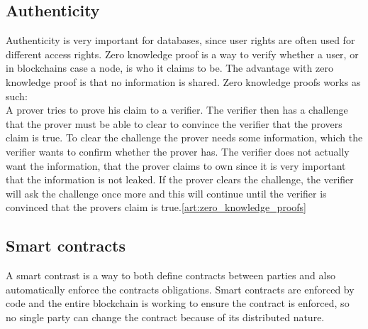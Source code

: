 \subsection{Authenticity}
Authenticity is very important for databases, since user rights are often used for different access rights. Zero knowledge proof is a way to verify whether a user, or in blockchains case a node, is who it claims to be. The advantage with zero knowledge proof is that no information is shared. Zero knowledge proofs works as such:\\
A prover tries to prove his claim to a verifier. The verifier then has a challenge that the prover must be able to clear to convince the verifier that the provers claim is true. To clear the challenge the prover needs some information, which the verifier wants to confirm whether the prover has. The verifier does not actually want the information, that the prover claims to own since it is very important that the information is not leaked. If the prover clears the challenge, the verifier will ask the challenge once more and this will continue until the verifier is convinced that the provers claim is true.\ref{art:zero_knowledge_proofs}




\subsection{Smart contracts}
A smart contrast is a way to both define contracts between parties and also automatically enforce the contracts obligations. Smart contracts are enforced by code and the entire blockchain is working to ensure the contract is enforced, so no single party can change the contract because of its distributed nature\cite{website:blockchaintechnologies}.